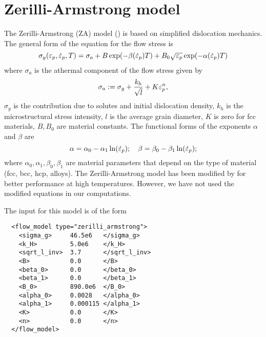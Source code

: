 \section{Zerilli-Armstrong model}
The Zerilli-Armstrong (ZA) model (\cite{Zerilli1987,Zerilli1993,Zerilli2004}) 
is based on simplified dislocation mechanics.  The general form of the
equation for the flow stress is
\begin{equation}
  \sigma_y(\varepsilon_p,\dot{\varepsilon}_{p},T) = 
    \sigma_a + B\exp(-\beta(\dot{\varepsilon}_{p}) T) + 
                         B_0\sqrt{\varepsilon_p}\exp(-\alpha(\dot{\varepsilon}_{p}) T)
\end{equation}
where $\sigma_a$ is the athermal component of the flow stress given by
\begin{equation}
  \sigma_a := \sigma_g + \frac{k_h}{\sqrt{l}} + K\varepsilon_p^n,
\end{equation}
$\sigma_g$ is the contribution due to solutes and initial dislocation
density, $k_h$ is the microstructural stress intensity, $l$ is the 
average grain diameter, $K$ is zero for fcc materials, 
$B, B_0$ are material constants.  The functional forms of the exponents 
$\alpha$ and $\beta$ are 
\begin{equation}
  \alpha = \alpha_0 - \alpha_1 \ln(\dot{\varepsilon}_{p}); \quad
  \beta = \beta_0 - \beta_1 \ln(\dot{\varepsilon}_{p}); 
\end{equation}
where $\alpha_0, \alpha_1, \beta_0, \beta_1$ are material parameters that
depend on the type of material (fcc, bcc, hcp, alloys).  The Zerilli-Armstrong
model has been modified by \cite{Abed2005} for better performance at high 
temperatures.  However, we have not used the modified equations in our
computations.

The input for this model is of the form
\lstset{language=XML}
\begin{lstlisting}
  <flow_model type="zerilli_armstrong">
    <sigma_g>     46.5e6   </sigma_g>
    <k_H>         5.0e6    </k_H>
    <sqrt_l_inv>  3.7      </sqrt_l_inv>
    <B>           0.0      </B>
    <beta_0>      0.0      </beta_0>
    <beta_1>      0.0      </beta_1>
    <B_0>         890.0e6  </B_0>
    <alpha_0>     0.0028   </alpha_0>
    <alpha_1>     0.000115 </alpha_1>
    <K>           0.0      </K>
    <n>           0.0      </n>
  </flow_model>
\end{lstlisting}

